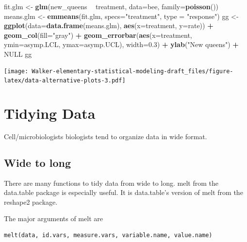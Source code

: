 \documentclass[]{book}
\newenvironment{Shaded}{\begin{snugshade}}{\end{snugshade}}
\newcommand{\KeywordTok}[1]{\textcolor[rgb]{0.13,0.29,0.53}{\textbf{#1}}}
\newcommand{\DataTypeTok}[1]{\textcolor[rgb]{0.13,0.29,0.53}{#1}}
\newcommand{\FloatTok}[1]{\textcolor[rgb]{0.00,0.00,0.81}{#1}}
\newcommand{\StringTok}[1]{\textcolor[rgb]{0.31,0.60,0.02}{#1}}
\newcommand{\OtherTok}[1]{\textcolor[rgb]{0.56,0.35,0.01}{#1}}
\newcommand{\OperatorTok}[1]{\textcolor[rgb]{0.81,0.36,0.00}{\textbf{#1}}}
\newcommand{\NormalTok}[1]{#1}
\begin{document}
\begin{Shaded}
\begin{Highlighting}[]
\NormalTok{fit.glm <-}\StringTok{ }\KeywordTok{glm}\NormalTok{(new_queens }\OperatorTok{~}\StringTok{ }\NormalTok{treatment, }\DataTypeTok{data=}\NormalTok{bee, }\DataTypeTok{family=}\KeywordTok{poisson}\NormalTok{())}
\NormalTok{means.glm <-}\StringTok{ }\KeywordTok{emmeans}\NormalTok{(fit.glm, }\DataTypeTok{specs=}\StringTok{"treatment"}\NormalTok{, }\DataTypeTok{type =} \StringTok{"response"}\NormalTok{)}
\NormalTok{gg <-}\StringTok{ }\KeywordTok{ggplot}\NormalTok{(}\DataTypeTok{data=}\KeywordTok{data.frame}\NormalTok{(means.glm), }\KeywordTok{aes}\NormalTok{(}\DataTypeTok{x=}\NormalTok{treatment, }\DataTypeTok{y=}\NormalTok{rate)) }\OperatorTok{+}
\StringTok{  }\KeywordTok{geom_col}\NormalTok{(}\DataTypeTok{fill=}\StringTok{"gray"}\NormalTok{) }\OperatorTok{+}\StringTok{ }
\StringTok{  }\KeywordTok{geom_errorbar}\NormalTok{(}\KeywordTok{aes}\NormalTok{(}\DataTypeTok{x=}\NormalTok{treatment, }\DataTypeTok{ymin=}\NormalTok{asymp.LCL, }\DataTypeTok{ymax=}\NormalTok{asymp.UCL), }\DataTypeTok{width=}\FloatTok{0.3}\NormalTok{) }\OperatorTok{+}
\StringTok{  }\KeywordTok{ylab}\NormalTok{(}\StringTok{"New queens"}\NormalTok{) }\OperatorTok{+}
\StringTok{  }\OtherTok{NULL}
\NormalTok{gg}
\end{Highlighting}
\end{Shaded}

\texttt{[image: Walker-elementary-statistical-modeling-draft\_files/figure-latex/data-alternative-plots-3.pdf]}

\section{Tidying Data}\label{tidying-data}

Cell/microbiologists biologists tend to organize data in wide format.

\subsection{Wide to long}\label{wide-to-long}

There are many functions to tidy data from wide to long. melt from the
data.table package is especially useful. It is data.table's version of
melt from the reshape2 package.

The major arguments of melt are

\texttt{melt(data,\ id.vars,\ measure.vars,\ variable.name,\ value.name)}
\end{document}
